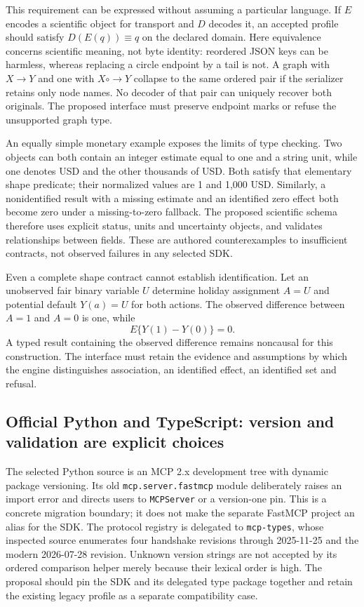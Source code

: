 This requirement can be expressed without assuming a particular language.
If $E$ encodes a scientific object for transport and $D$ decodes it, an accepted
profile should satisfy $D(E(q))\equiv q$ on the declared domain. Here
equivalence concerns scientific meaning, not byte identity: reordered JSON
keys can be harmless, whereas replacing a circle endpoint by a tail is not.
A graph with $X\to Y$ and one with $X\mathbin{\circ\!\!\to}Y$ collapse to
the same ordered pair if the serializer retains only node names. No decoder
of that pair can uniquely recover both originals. The proposed interface must
preserve endpoint marks or refuse the unsupported graph type.
\citep{exec24_mcp_contracts}

An equally simple monetary example exposes the limits of type checking.
Two objects can both contain an integer estimate equal to one and a string
unit, while one denotes USD and the other thousands of USD. Both satisfy that
elementary shape predicate; their normalized values are 1 and 1,000 USD.
Similarly, a nonidentified result with a missing estimate and an identified
zero effect both become zero under a missing-to-zero fallback. The proposed
scientific schema therefore uses explicit status, units and uncertainty
objects, and validates relationships between fields. These are authored
counterexamples to insufficient contracts, not observed failures in any
selected SDK.~\citep{exec24_mcp_contracts}

Even a complete shape contract cannot establish identification. Let an
unobserved fair binary variable $U$ determine holiday assignment $A=U$ and
potential default $Y(a)=U$ for both actions. The observed difference between
$A=1$ and $A=0$ is one, while
\[
 E\{Y(1)-Y(0)\}=0.
\]
A typed result containing the observed difference remains noncausal for this
construction. The interface must retain the evidence and assumptions by which
the engine distinguishes association, an identified effect, an identified
set and refusal.~\citep{exec24_mcp_contracts}

\subsection{Official Python and TypeScript: version and validation are explicit choices}

The selected Python source is an MCP 2.x development tree with dynamic package
versioning. Its old \texttt{mcp.server.fastmcp} module deliberately raises an
import error and directs users to \texttt{MCPServer} or a version-one pin. This
is a concrete migration boundary; it does not make the separate FastMCP
project an alias for the SDK. The protocol registry is delegated to
\texttt{mcp-types}, whose inspected source enumerates four handshake revisions
through 2025-11-25 and the modern 2026-07-28 revision. Unknown version strings
are not accepted by its ordered comparison helper merely because their
lexical order is high. The proposal should pin the SDK and its delegated type
package together and retain the existing legacy profile as a separate
compatibility case.~\citep{exec24_mcp_python}

